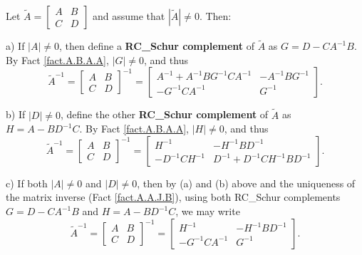 \begin{fact} \label{fact.A.B.A.B}
Let $\tilde A=\begin{bmatrix} A & B \\ C & D \end{bmatrix}$
and assume that $|\tilde A|\ne 0$.  Then:

\noindent a) If $|A|\ne 0$, then define a {\bf RC_Schur complement} of
$\tilde A$ as $G=D-CA^{-1}B$.  By Fact \ref{fact.A.B.A.A}, $|G|\ne 0$, and thus
\begin{equation*}
    \tilde A^{-1} = \begin{bmatrix} A & B \\ C & D \end{bmatrix}^{-1} =
    \begin{bmatrix} A^{-1}+A^{-1} B G^{-1} C A^{-1} & -A^{-1} B G^{-1} \\ -G^{-1} C A^{-1} & G^{-1} \end{bmatrix}.
\end{equation*}

\noindent b) If $|D|\ne 0$, define the other {\bf RC_Schur
complement} of $\tilde A$ as $H=A-BD^{-1}C$.  By Fact \ref{fact.A.B.A.A}, $|H|\ne 0$, and thus
\begin{equation*}
    \tilde A^{-1} = \begin{bmatrix} A & B \\ C & D \end{bmatrix}^{-1} =
    \begin{bmatrix} H^{-1} & -H^{-1} B D^{-1} \\ - D^{-1} C H^{-1} & D^{-1}+ D^{-1} C H^{-1} B D^{-1}  \end{bmatrix}.
\end{equation*}

\noindent c) If both $|A|\ne 0$ and $|D|\ne 0$, then by (a) and (b) above and the uniqueness of the matrix inverse (Fact \ref{fact.A.A.J.B}),
using both RC_Schur complements $G=D-CA^{-1}B$ and $H=A-BD^{-1}C$, we may write
\begin{equation*}
    \tilde A^{-1} = \begin{bmatrix} A & B \\ C & D \end{bmatrix}^{-1} =
    \begin{bmatrix} H^{-1} & -H^{-1}BD^{-1} \\  -G^{-1}CA^{-1} & G^{-1} \end{bmatrix}.
\end{equation*}
\end{fact}

